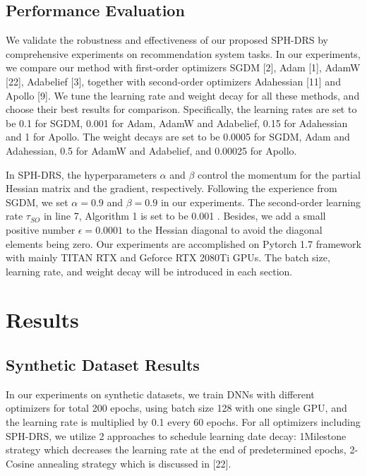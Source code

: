 \documentclass[conference]{IEEEtran}
\begin{document}
\subsection{Performance Evaluation}

We validate the robustness and effectiveness of our proposed SPH-DRS by comprehensive experiments on recommendation system tasks. In our experiments, we compare our method with first-order optimizers SGDM [2], Adam [1], AdamW [22], Adabelief [3], together with second-order optimizers Adahessian [11] and Apollo [9]. We tune the learning rate and weight decay for all these methods, and choose their best results for comparison. Specifically, the learning rates are set to be 0.1 for SGDM, 0.001 for Adam, AdamW and Adabelief, 0.15 for Adahessian and 1 for Apollo. The weight decays are set to be 0.0005 for SGDM, Adam and Adahessian, 0.5 for AdamW and Adabelief, and 0.00025 for Apollo.

In SPH-DRS, the hyperparameters $\alpha$ and $\beta$ control the momentum for the partial Hessian matrix and the gradient, respectively. Following the experience from SGDM, we set $\alpha=0.9$ and $\beta=0.9$ in our experiments. The second-order learning rate $\tau_{S O}$ in line 7, Algorithm 1 is set to be 0.001 . Besides, we add a small positive number $\epsilon=0.0001$ to the Hessian diagonal to avoid the diagonal elements being zero. Our experiments are accomplished on Pytorch 1.7 framework with mainly TITAN RTX and Geforce RTX 2080Ti GPUs. The batch size, learning rate, and weight decay will be introduced in each section.

\section{Results}

\subsection{Synthetic Dataset Results}

In our experiments on synthetic datasets, we train DNNs with different optimizers for total 200 epochs, using batch size 128 with one single GPU, and the learning rate is multiplied by 0.1 every 60 epochs. For all optimizers including SPH-DRS, we utilize 2 approaches to schedule learning date decay: 1Milestone strategy which decreases the learning rate at the end of predetermined epochs, 2- Cosine annealing strategy which is discussed in [22].
\end{document}
